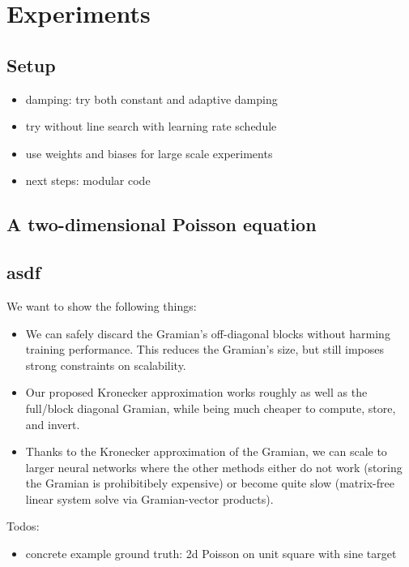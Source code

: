 \documentclass{article}
\begin{document}
\section{Experiments}

\subsection{Setup}
\begin{itemize}
    \item damping: try both constant and adaptive damping 
    \item try without line search with learning rate schedule 
    \item use weights and biases for large scale experiments 
    \item next steps: modular code 
\end{itemize}

\subsection{A two-dimensional Poisson equation}



\subsection{asdf}

We want to show the following things:
\begin{itemize}
\item We can safely discard the Gramian's off-diagonal blocks without harming
  training performance. This reduces the Gramian's size, but still imposes
  strong constraints on scalability.

\item Our proposed Kronecker approximation works roughly as well as the
  full/block diagonal Gramian, while being much cheaper to compute, store, and
  invert.

\item Thanks to the Kronecker approximation of the Gramian, we can scale to larger neural networks where the other methods either do not work (storing the Gramian is prohibitibely expensive) or become quite slow (matrix-free linear system solve via Gramian-vector products).
\end{itemize}

Todos:
\begin{itemize}
\item concrete example ground truth: 2d Poisson on unit square with sine target
\end{itemize}
\end{document}
